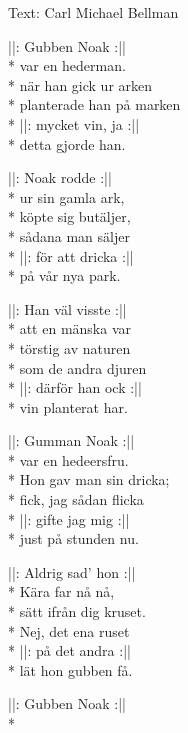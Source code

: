 \begin{SongText}
\begin{SongInfo}
    Text: Carl Michael Bellman
\end{SongInfo}
\begin{SongVerse}
||: Gubben Noak :||\\*%
var en hederman.\\*%
när han gick ur arken\\*%
planterade han på marken\\*%
||: mycket vin, ja :||\\*%
detta gjorde han.
\end{SongVerse}
\begin{SongVerse}
||: Noak rodde :||\\*%
ur sin gamla ark,\\*%
köpte sig butäljer,\\*%
sådana man säljer\\*%
||: för att dricka :||\\*%
på vår nya park.
\end{SongVerse}
\begin{SongVerse}
||: Han väl visste :||\\*%
att en mänska var\\*%
törstig av naturen\\*%
som de andra djuren\\*%
||: därför han ock :||\\*%
vin planterat har.
\end{SongVerse}
\begin{SongVerse}
||: Gumman Noak :||\\*%
var en hedeersfru.\\*%
Hon gav man sin dricka;\\*%
fick, jag sådan flicka\\*%
||: gifte jag mig :||\\*%
just på stunden nu.
\end{SongVerse}
\begin{SongVerse}
||: Aldrig sad’ hon :||\\*%
Kära far nå nå,\\*%
sätt ifrån dig kruset.\\*%
Nej, det ena ruset\\*%
||: på det andra :||\\*%
lät hon gubben få.
\end{SongVerse}
\begin{SongVerse}
||: Gubben Noak :||\\*%

\end{SongVerse}
\end{SongText}
